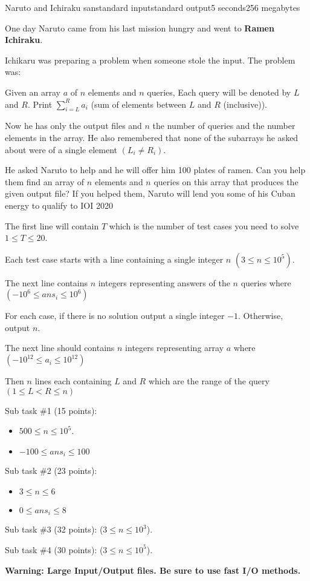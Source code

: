 \begin{problem}{Naruto and Ichiraku san}{standard input}{standard output}{5 seconds}{256 megabytes}

One day Naruto came from his last mission hungry and went to \textbf{Ramen Ichiraku}.

Ichikaru was preparing a problem when someone stole the input. The problem was: 

Given an array $a$ of $n$ elements and $n$ queries, Each query will be denoted by $L$ and $R$. Print $\sum\limits_{i=L}^R a_i$ (sum of elements between $L$ and $R$ (inclusive)).

Now he has only the output files and $n$ the number of queries and the number elements in the array. He also remembered that none of the subarrays he asked about were of a single element $(L_i \neq R_i)$.

He asked Naruto to help and he will offer him 100 plates of ramen. Can you help them find an array of $n$ elements and $n$ queries on this array that produces the given output file? If you helped them, Naruto will lend you some of his Cuban energy to qualify to IOI 2020

\InputFile
The first line will contain $T$  which is the number of test cases you need to solve $1 \le T \le 20$.

Each test case starts with a line containing a single integer $n$ $(3 \le n \le 10^{5})$.

The next line contains $n$ integers representing answers of the $n$ queries where $(-10^{6} \leq ans_i \le 10^{6})$


\OutputFile
For each case, if there is no solution output a single integer $-1$. Otherwise, output $n$.

The next line should contains $n$ integers representing array $a$ where $(-10^{12} \leq a_i \le 10^{12})$

Then $n$ lines each containing $L$ and $R$ which are the range of the query $(1 \le L < R \le n)$

\Scoring
Sub task \#1 (15 points):
\begin{itemize}
\item $500 \leq n \leq 10^5$.
\item $-100 \le ans_i \le 100$
\end{itemize}

Sub task \#2 (23 points): 
\begin{itemize}
\item $3 \leq n \leq 6$
\item $0 \le ans_i \le 8$
\end{itemize}

Sub task \#3 (32 points): ($3 \leq n \leq 10^3$).

Sub task \#4 (30 points): ($3 \leq n \leq 10^5$).

\Example

\begin{example}
%
\end{example}

\Note
\textbf{Warning: Large Input/Output files. Be sure to use fast I/O methods.}

\end{problem}

